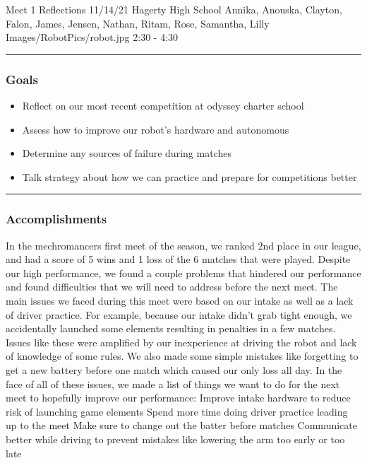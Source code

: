 \insertmeeting 
	{Meet 1 Reflections} 
	{11/14/21} 
	{Hagerty High School}
	{Annika, Anouska, Clayton, Falon, James, Jensen, Nathan, Ritam, Rose, Samantha, Lilly}
	{Images/RobotPics/robot.jpg}
	{2:30 - 4:30}
	
\noindent\hfil\rule{\textwidth}{.4pt}\hfil
\subsubsection*{Goals}
\begin{itemize}
    \item Reflect on our most recent competition at odyssey charter school
    \item Assess how to improve our robot’s hardware and autonomous
    \item Determine any sources of failure during matches
    \item Talk strategy about how we can practice and prepare for competitions better


\end{itemize} 

\noindent\hfil\rule{\textwidth}{.4pt}\hfil

\subsubsection*{Accomplishments}
In the mechromancers first meet of the season, we ranked 2nd place in our league, and had a score of 5 wins and 1 loss of the 6 matches that were played. Despite our high performance, we found a couple problems that hindered our performance and found difficulties that we will need to address before the next meet. The main issues we faced during this meet were based on our intake as well as a lack of driver practice. For example, because our intake didn’t grab tight enough, we accidentally launched some elements resulting in penalties in a few matches. Issues like these were amplified by our inexperience at driving the robot and lack of knowledge of some rules. We also made some simple mistakes like forgetting to get a new battery before one match which caused our only loss all day. In the face of all of these issues, we made a list of things we want to do for the next meet to hopefully improve our performance:
Improve intake hardware to reduce risk of launching game elements
Spend more time doing driver practice leading up to the meet
Make sure to change out the batter before matches
Communicate better while driving to prevent mistakes like lowering the arm too early or too late

